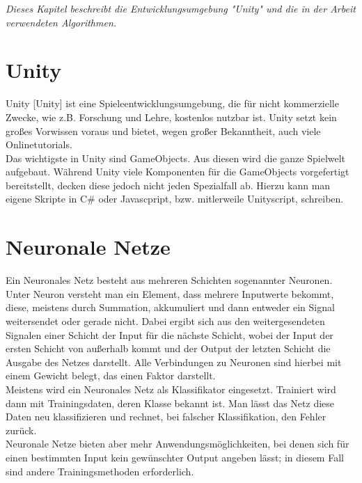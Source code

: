 \documentclass[
	12pt,
	a4paper,
	BCOR10mm,
	DIV14,
	headsepline,
	usegeometry,
]{scrreprt}
\begin{document}
\textit{%
Dieses Kapitel beschreibt die Entwicklungsumgebung "Unity" und die in der Arbeit verwendeten Algorithmen.}

\section{Unity}
Unity [Unity] ist eine Spieleentwicklungsumgebung, die für nicht kommerzielle Zwecke, wie z.B. Forschung und Lehre, kostenlos nutzbar ist. Unity setzt kein großes Vorwissen voraus und bietet, wegen großer Bekanntheit, auch viele Onlinetutorials.\\
Das wichtigste in Unity sind GameObjects. Aus diesen wird die ganze Spielwelt aufgebaut. Während Unity viele Komponenten für die GameObjects vorgefertigt bereitstellt, decken diese jedoch nicht jeden Spezialfall ab. Hierzu kann man eigene Skripte in C\# oder Javascpript, bzw. mitlerweile Unityscript, schreiben.


\section{Neuronale Netze}
Ein Neuronales Netz besteht aus mehreren Schichten sogenannter Neuronen. Unter Neuron versteht man ein Element, dass mehrere Inputwerte bekommt, diese, meistens durch Summation, akkumuliert und dann entweder ein Signal weitersendet oder gerade nicht. Dabei ergibt sich aus den weitergesendeten Signalen einer Schicht der Input für die nächste Schicht, wobei der Input der ersten Schicht von außerhalb kommt und der Output der letzten Schicht die Ausgabe des Netzes darstellt. Alle Verbindungen zu Neuronen sind hierbei mit einem Gewicht belegt, das einen Faktor darstellt.\\ Meistens wird ein Neuronales Netz als Klassifikator eingesetzt. Trainiert wird dann mit Trainingsdaten, deren Klasse bekannt ist. Man lässt das Netz diese Daten neu klassifizieren und rechnet, bei falscher Klassifikation, den Fehler zurück.\\
Neuronale Netze bieten aber mehr Anwendungsmöglichkeiten, bei denen sich für einen bestimmten Input kein gewünschter Output angeben lässt; in diesem Fall sind andere Trainingsmethoden erforderlich.

\pagebreak
\end{document}
